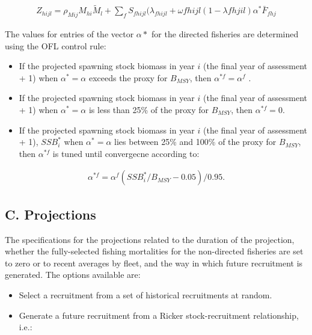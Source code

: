 \documentclass[]{article}
\providecommand{\tightlist}{%
  \setlength{\itemsep}{0pt}\setlength{\parskip}{0pt}}
\begin{document}
\begin{align}
Z_{hijl} = \rho_{Mij}M_{hi}\tilde{M}_{l} + \sum_{f} S_{fhijl}(\lambda_{fhijl} + \omega{fhijl}(1-\lambda{fhjil})\alpha^{*}\bar{F}_{fhj}
\end{align}

The values for entries of the vector \(\alpha{*}\) for the directed
fisheries are determined using the OFL control rule:

\begin{itemize}
\tightlist
\item
  If the projected spawning stock biomass in year \(i\) (the final year
  of assessment + 1) when \(\alpha^{*} = \alpha\) exceeds the proxy for
  \(B_{MSY}\), then \(\alpha^{*f} = \alpha^{f}\) .
\item
  If the projected spawning stock biomass in year \(i\) (the final year
  of assessment + 1) when \(\alpha^{*} = \alpha\) is less than 25\% of
  the proxy for \(B_{MSY}\), then \(\alpha^{*f} = 0\).
\item
  If the projected spawning stock biomass in year \(i\) (the final year
  of assessment + 1), \(SSB^{*}_{i}\) when \(\alpha^{*} = \alpha\) lies
  between 25\% and 100\% of the proxy for \(B_{MSY}\), then
  \(\alpha^{*f}\) is tuned until convergecne according to:
\end{itemize}

\begin{align}
  \alpha^{*f} = \alpha^{f}(SSB^{*}_{i} / B_{MSY} - 0.05)/0.95.
 \end{align}

\hypertarget{c.-projections}{%
\subsection{C. Projections}\label{c.-projections}}

The specifications for the projections related to the duration of the
projection, whether the fully-selected fishing mortalities for the
non-directed fisheries are set to zero or to recent averages by fleet,
and the way in which future recruitment is generated. The options
available are:

\begin{itemize}
\tightlist
\item
  Select a recruitment from a set of historical recruitments at random.
\item
  Generate a future recruitment from a Ricker stock-recruitment
  relationship, i.e.:
\end{itemize}
\end{document}
